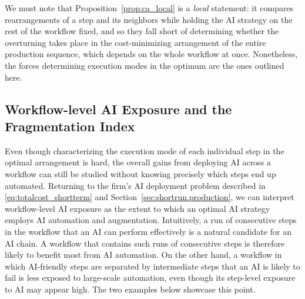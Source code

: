 We must note that Proposition~\ref{prop:ca_local} is a \emph{local} statement: it compares rearrangements of a step and its neighbors while holding the AI strategy on the rest of the workflow fixed, and so they fall short of determining whether the overturning takes place in the cost-minimizing arrangement of the entire production sequence, which depends on the whole workflow at once.
Nonetheless, the forces determining execution modes in the optimum are the ones outlined here.



\subsection{Workflow-level AI Exposure and the Fragmentation Index}
\label{sec:fragmentation}

Even though characterizing the execution mode of each individual step in the optimal arrangement is hard, the overall gains from deploying AI across a workflow can still be studied without knowing precisely which steps end up automated.
Returning to the firm's AI deployment problem described in \eqref{eq:totalcost_shortterm} and Section~\ref{sec:shortrun.production}, we can interpret workflow-level AI exposure as the extent to which an optimal AI strategy employs AI automation and augmentation.
Intuitively, a run of consecutive steps in the workflow that an AI can perform effectively is a natural candidate for an AI chain.
A workflow that contains such runs of consecutive steps is therefore likely to benefit most from AI automation.
On the other hand, a workflow in which AI-friendly steps are separated by intermediate steps that an AI is likely to fail is less exposed to large-scale automation, even though its step-level exposure to AI may appear high. 
The two examples below showcase this point.

